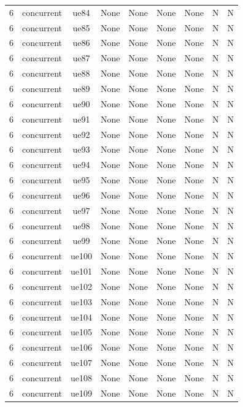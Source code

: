 \begin{table}[ht]
\begin{tabular}{|c|c|c|c|c|c|c|c|c|}
6 & concurrent & ue84 & None & None & None & None & N & N \\
6 & concurrent & ue85 & None & None & None & None & N & N \\
6 & concurrent & ue86 & None & None & None & None & N & N \\
6 & concurrent & ue87 & None & None & None & None & N & N \\
6 & concurrent & ue88 & None & None & None & None & N & N \\
6 & concurrent & ue89 & None & None & None & None & N & N \\
6 & concurrent & ue90 & None & None & None & None & N & N \\
6 & concurrent & ue91 & None & None & None & None & N & N \\
6 & concurrent & ue92 & None & None & None & None & N & N \\
6 & concurrent & ue93 & None & None & None & None & N & N \\
6 & concurrent & ue94 & None & None & None & None & N & N \\
6 & concurrent & ue95 & None & None & None & None & N & N \\
6 & concurrent & ue96 & None & None & None & None & N & N \\
6 & concurrent & ue97 & None & None & None & None & N & N \\
6 & concurrent & ue98 & None & None & None & None & N & N \\
6 & concurrent & ue99 & None & None & None & None & N & N \\
6 & concurrent & ue100 & None & None & None & None & N & N \\
6 & concurrent & ue101 & None & None & None & None & N & N \\
6 & concurrent & ue102 & None & None & None & None & N & N \\
6 & concurrent & ue103 & None & None & None & None & N & N \\
6 & concurrent & ue104 & None & None & None & None & N & N \\
6 & concurrent & ue105 & None & None & None & None & N & N \\
6 & concurrent & ue106 & None & None & None & None & N & N \\
6 & concurrent & ue107 & None & None & None & None & N & N \\
6 & concurrent & ue108 & None & None & None & None & N & N \\
6 & concurrent & ue109 & None & None & None & None & N & N \\

\end{tabular}
\end{table}
